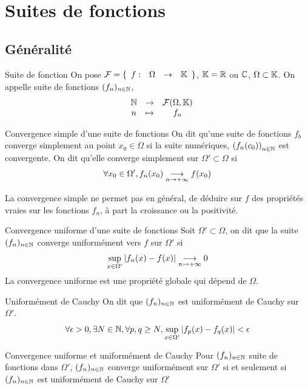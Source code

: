 \documentclass[]{report}
\begin{document}
\section{Suites de fonctions}

\subsection{Généralité}

\begin{df}{Suite de fonction}{}
    On pose $\mathcal{F}=\{\begin{array}{ccccc} f : & \Omega & \to & \mathbb{K} \end{array}\}$, $\mathbb{K}=\mathbb{R}$ ou $\mathbb{C}$, $\Omega\subset \mathbb{K}$. On appelle suite de fonctions $(f_n)_{n\in\mathbb{N}}$, 
    \[\begin{array}{ccccc} & \mathbb{N} & \to & \mathcal{F}(\Omega,\mathbb{K}) \\ & n & \mapsto & f_n \end{array}\]
\end{df}

\begin{df}{Convergence simple d'une suite de fonctions}{}
    On dit qu'une suite de fonctions $f_b$ converge simplement au point $x_0\in \Omega$ si la suite numériques, $\left(f_n(c_0)\right)_{n\in\mathbb{N}}$ est convergente. On dit qu'elle converge simplement sur $\Omega'\subset \Omega$ si
    \[\forall x_0\in \Omega',f_n(x_0)\underset{n\to +\infty}{\longrightarrow} f(x_0)\]
\end{df}

\begin{re}{}{}
    La convergence simple ne permet pas en général, de déduire sur $f$ des propriétés vraies sur les fonctions $f_n$, à part la croissance ou la positivité.
\end{re}

\begin{df}{Convergence uniforme d'une suite de fonctions}{}
    Soit $\Omega'\subset \Omega$, on dit que la suite $(f_n)_{n\in\mathbb{N}}$ converge uniformément vers $f$ sur $\Omega'$ si
    \[\sup_{x\in \Omega'}\left|f_n(x)-f(x)\right|\underset{n\to +\infty}{\longrightarrow} 0\]
    La convergence uniforme est une propriété globale qui dépend de $\Omega$.
\end{df}

\begin{df}{Uniformément de Cauchy}{}
    On dit que $(f_n)_{n\in\mathbb{N}}$ est uniformément de Cauchy sur $\Omega'$.
    \[\forall \epsilon>0,\exists N\in \mathbb{N},\forall p,q\ge N, \sup_{x\in \Omega'}\left|f_p(x)-f_q(x)\right|<\epsilon\]
\end{df}

\begin{prop}{Convergence uniforme et uniformément de Cauchy}{}
    Pour $(f_n)_{n\in\mathbb{N}}$ suite de fonctions dans $\Omega'$, $(f_n)_{n\in\mathbb{N}}$ converge uniformément sur $\Omega'$ si et seulement si $(f_n)_{n\in\mathbb{N}}$ est uniformément de Cauchy sur $\Omega'$
\end{prop}
\end{document}
